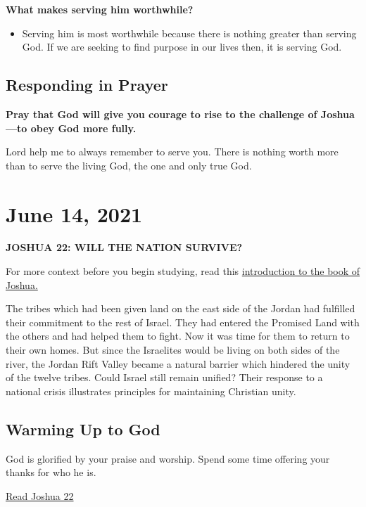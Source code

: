 \documentclass[11pt]{article}
\begin{document}
\textbf{\textbf{What makes serving him worthwhile?}}
\begin{itemize}
\item Serving him is most worthwhile because there is nothing greater than
serving God. If we are seeking to find purpose in our lives then, it
is serving God.
\end{itemize}

\subsection{Responding in Prayer}
\label{sec:org270d524}

\textbf{\textbf{Pray that God will give you courage to rise to the challenge of Joshua—to obey God more fully.}}

Lord help me to always remember to serve you. There is nothing worth
more than to serve the living God, the one and only true God.

\section{June 14, 2021}
\label{sec:org5883326}

\textbf{\textbf{JOSHUA 22: WILL THE NATION SURVIVE?}}

For more context before you begin studying, read this \href{https://www.ivpress.com/daily-bible-study/introducing-joshua}{introduction to
the book of Joshua.}

The tribes which had been given land on the east side of the Jordan
had fulfilled their commitment to the rest of Israel. They had entered
the Promised Land with the others and had helped them to fight. Now it
was time for them to return to their own homes. But since the
Israelites would be living on both sides of the river, the Jordan Rift
Valley became a natural barrier which hindered the unity of the twelve
tribes. Could Israel still remain unified? Their response to a
national crisis illustrates principles for maintaining Christian
unity.

\subsection{Warming Up to God}
\label{sec:orgc17e2c0}

God is glorified by your praise and worship. Spend some time offering
your thanks for who he is.

\href{https://www.biblegateway.com/passage/?search=Joshua\%2022\&version=NIV\&interface=print}{Read Joshua 22}
\end{document}
